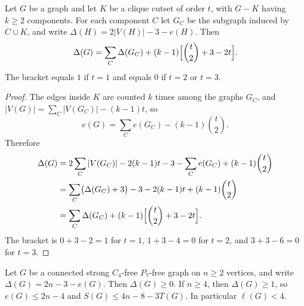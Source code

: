 \documentclass[ASNA]{USG}
\theoremstyle{WBstyletwo}
\numberwithin{equation}{section}
\newcommand{\lr}{\ell}
\begin{document}
\begin{lemma}\label{lem:deficit}
Let $G$ be a graph and let $K$ be a clique cutset of order $t$, with $G-K$ having $k\ge 2$ components. For each component $C$ let $G_C$ be the subgraph induced by $C\cup K$, and write $\Delta(H)=2|V(H)|-3-e(H)$. Then
\[
\Delta(G)=\sum_C\Delta(G_C)+(k-1)\Bigl[\binom{t}{2}+3-2t\Bigr].
\]
The bracket equals $1$ if $t=1$ and equals $0$ if $t=2$ or $t=3$.
\end{lemma}

\begin{proof}
The edges inside $K$ are counted $k$ times among the graphs $G_C$, and $|V(G)|=\sum_C|V(G_C)|-(k-1)t$, so
\[
e(G)=\sum_C e(G_C)-(k-1)\binom{t}{2}.
\]
Therefore
\begin{align*}
\Delta(G)
&=2\sum_C|V(G_C)|-2(k-1)t-3-\sum_C e(G_C)+(k-1)\binom{t}{2}\\
&=\sum_C\bigl(\Delta(G_C)+3\bigr)-3-2(k-1)t+(k-1)\binom{t}{2}\\
&=\sum_C\Delta(G_C)+(k-1)\Bigl[\binom{t}{2}+3-2t\Bigr].
\end{align*}
The bracket is $0+3-2=1$ for $t=1$, $1+3-4=0$ for $t=2$, and $3+3-6=0$ for $t=3$.
\end{proof}

\begin{lemma}\label{lem:e2n}
Let $G$ be a connected strong $C_4$-free $P_7$-free graph on $n\ge 2$ vertices, and write $\Delta(G)=2n-3-e(G)$. Then $\Delta(G)\ge 0$. If $n\ge 4$, then $\Delta(G)\ge 1$, so $e(G)\le 2n-4$ and $S(G)\le 4n-8-3T(G)$. In particular $\lr(G)<4$.
\end{lemma}
\end{document}

